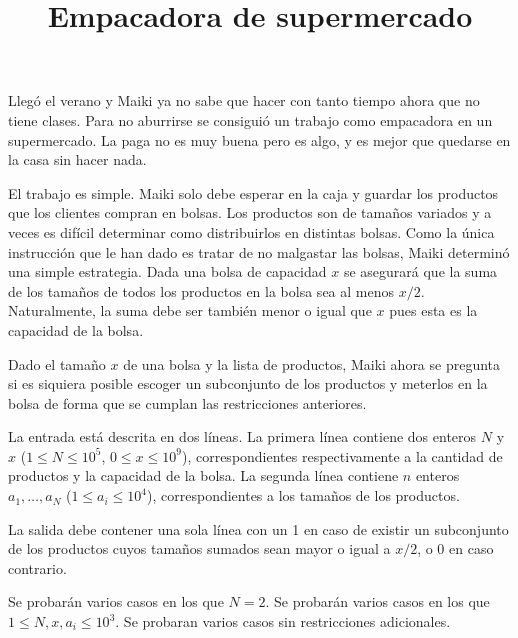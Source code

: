 \documentclass{oci}
\title{Empacadora de supermercado}
\begin{document}
\begin{problemDescription}
Llegó el verano y Maiki ya no sabe que hacer con tanto tiempo ahora que no tiene clases.
Para no aburrirse se consiguió un trabajo como empacadora en un supermercado.
La paga no es muy buena pero es algo, y es mejor que quedarse en la casa sin hacer nada.

El trabajo es simple.
Maiki solo debe esperar en la caja y guardar los productos que los clientes compran en bolsas.
Los productos son de tamaños variados y a veces es difícil determinar como distribuirlos
en distintas bolsas.
Como la única instrucción que le han dado es tratar de no malgastar las bolsas,
Maiki determinó una simple estrategia.
Dada una bolsa de capacidad $x$ se asegurará que la suma de los tamaños de todos los productos
en la bolsa sea al menos $x/2$.
Naturalmente, la suma debe ser también menor o igual que $x$ pues esta es la capacidad
de la bolsa.

Dado el tamaño $x$ de una bolsa y la lista de productos, Maiki ahora se pregunta si es siquiera
posible escoger un subconjunto de los productos y meterlos en la bolsa de forma que se cumplan
las restricciones anteriores.

\end{problemDescription}

\begin{inputDescription}
La entrada está descrita en dos líneas.
La primera línea contiene dos enteros $N$ y $x$ ($1\leq N\leq 10^5$, $0 \leq x \leq 10^9$),
correspondientes respectivamente a la cantidad de productos y la capacidad de la bolsa.
La segunda línea contiene $n$ enteros $a_1,\ldots, a_N$ ($1\leq a_i\leq 10^4$), correspondientes
a los tamaños de los productos.
\end{inputDescription}

\begin{outputDescription}
La salida debe contener una sola línea con un 1 en caso de existir un subconjunto de los productos
cuyos tamaños sumados sean mayor o igual a $x/2$, o 0 en caso contrario.
\end{outputDescription}

\begin{scoreDescription}
  Se probarán varios casos en los que $N = 2$.
  Se probarán varios casos en los que $1 \leq N, x, a_i \leq 10^3$.
  Se probaran varios casos sin restricciones adicionales.
\end{scoreDescription}

\begin{sampleDescription}
\end{sampleDescription}
\end{document}
